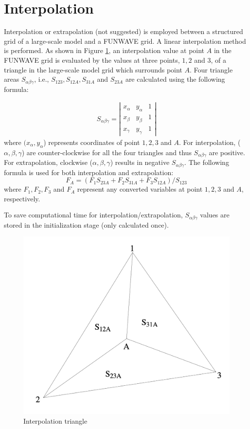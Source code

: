 \documentclass[preprint,10pt]{elsarticle}
\newcommand{\be}{\begin{equation}}
\newcommand{\ee}{\end{equation}}
\newcommand{\ba}{\begin{eqnarray}}
\newcommand{\ea}{\end{eqnarray}}
\begin{document}
 \section{Interpolation} 
  
  Interpolation or extrapolation (not suggested) is  employed between a structured grid of a large-scale model
 and a FUNWAVE grid.  A linear interpolation method is performed.
As shown in Figure \ref{triangle}, an interpolation
value at  point $A$ in the FUNWAVE grid is evaluated by the values at three points, $1,
2$ and $3$, of a triangle in the large-scale model grid which surrounds point $A$.  Four triangle areas
$S_{\alpha \beta \gamma}$, i.e., $S_{123}, S_{12A}, S_{31A}$ and $S_{23A}$ are
calculated using the following formula:
  
\ba
S_{\alpha \beta \gamma}=\left | \begin{array}{ccc}x_\alpha & y_\alpha & 1 \\
x_\beta & y_\beta & 1 \\
x_\gamma & y_\gamma &1 
\end{array}
\right |
\ea
where $(x_{\alpha}, y_{\alpha}$) represents
coordinates of point $1, 2, 3$ and $A$.  For interpolation, ($\alpha, \beta,
\gamma$) are  counter-clockwise for all the four triangles and thus $S_{\alpha
\beta \gamma}$ are positive. For extrapolation, clockwise ($\alpha, \beta,
\gamma$) results in negative $S_{\alpha
\beta \gamma}$. The following formula is used for both interpolation and
extrapolation:
\be
F_A=(F_1S_{23A}+F_2 S_{31A} + F_3 S_{12A})/S_{123}
\ee
where $F_1, F_2, F_3$ and $F_A$ represent any converted variables at
point $1, 2, 3 $ and $A$, respectively.

To save computational time for interpolation/extrapolation, $S_{\alpha
\beta \gamma}$ values are stored in the initialization stage (only calculated once).  
  
 \begin{figure}
\begin{center}
 \includegraphics[width=1.0\textwidth]{figures/triangle.png}
 \caption{Interpolation triangle }
 \label{triangle}
 \end{center}
 \end{figure}
  
\end{document}
